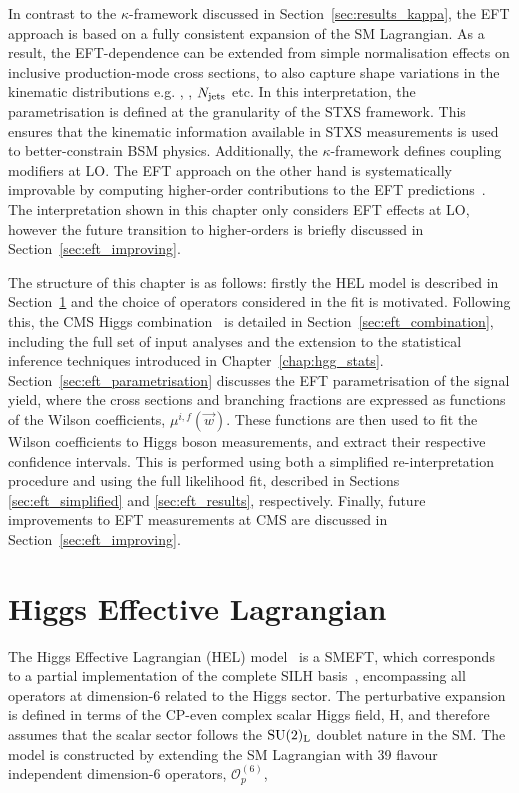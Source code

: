 In contrast to the $\kappa$-framework discussed in Section~\ref{sec:results_kappa}, the EFT approach is based on a fully consistent expansion of the SM Lagrangian. As a result, the EFT-dependence can be extended from simple normalisation effects on inclusive production-mode cross sections, to also capture shape variations in the kinematic distributions e.g. \ptH, \mjj, $N_{\rm{jets}}$ etc. In this interpretation, the parametrisation is defined at the granularity of the STXS framework. This ensures that the kinematic information available in STXS measurements is used to better-constrain BSM physics. Additionally, the $\kappa$-framework defines coupling modifiers at LO. The EFT approach on the other hand is systematically improvable by computing higher-order contributions to the EFT predictions~\cite{Degrande:2020evl}. The interpretation shown in this chapter only considers EFT effects at LO, however the future transition to higher-orders is briefly discussed in Section~\ref{sec:eft_improving}.

The structure of this chapter is as follows: firstly the HEL model is described in Section~\ref{sec:eft_hel} and the choice of operators considered in the fit is motivated. Following this, the CMS Higgs combination~\cite{CMS-PAS-HIG-19-005} is detailed in Section~\ref{sec:eft_combination}, including the full set of input analyses and the extension to the statistical inference techniques introduced in Chapter~\ref{chap:hgg_stats}. Section~\ref{sec:eft_parametrisation} discusses the EFT parametrisation of the signal yield, where the cross sections and branching fractions are expressed as functions of the Wilson coefficients, $\mu^{i,f}(\vec{w})$. These functions are then used to fit the Wilson coefficients to Higgs boson measurements, and extract their respective confidence intervals. This is performed using both a simplified re-interpretation procedure and using the full likelihood fit, described in Sections \ref{sec:eft_simplified} and \ref{sec:eft_results}, respectively. Finally, future improvements to EFT measurements at CMS are discussed in Section~\ref{sec:eft_improving}.

\section{Higgs Effective Lagrangian}\label{sec:eft_hel}

The Higgs Effective Lagrangian (HEL) model~\cite{Alloul:2013naa} is a SMEFT, which corresponds to a partial implementation of the complete SILH basis~\cite{Giudice:2007fh,Contino:2013kra}, encompassing all operators at dimension-6 related to the Higgs sector. The perturbative expansion is defined in terms of the CP-even complex scalar Higgs field, H, and therefore assumes that the scalar sector follows the ${\rm{SU}}(2)_{\rm{L}}$ doublet nature in the SM. The model is constructed by extending the SM Lagrangian with 39 flavour independent dimension-6 operators, $\mathcal{O}^{(6)}_p$, 

